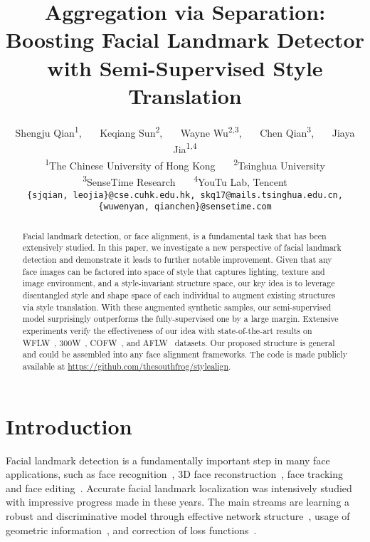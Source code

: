 \documentclass[10pt,twocolumn,letterpaper]{article}
\begin{document}
\title{Aggregation via Separation:
Boosting Facial Landmark Detector with Semi-Supervised Style Translation}

\author{Shengju Qian\textsuperscript{1},~~~  Keqiang Sun\textsuperscript{2},~~~ Wayne Wu\textsuperscript{2,3},~~~ Chen Qian\textsuperscript{3},~~~ Jiaya Jia\textsuperscript{1,4} \\
\textsuperscript{1}The Chinese University of Hong Kong~~~ \textsuperscript{2}Tsinghua University \\ \textsuperscript{3}SenseTime Research~~~ \textsuperscript{4}YouTu Lab, Tencent \\
{\tt\small \{sjqian, leojia\}@cse.cuhk.edu.hk, skq17@mails.tsinghua.edu.cn, \{wuwenyan, qianchen\}@sensetime.com}
}

\maketitle
\ificcvfinal\thispagestyle{empty}\fi
\begin{abstract}
  Facial landmark detection, or face alignment, is a fundamental task that has been extensively studied. In this paper, we investigate a new perspective of facial landmark detection and demonstrate it leads to further notable improvement. Given that any face images can be factored into space of style that captures lighting, texture and image environment, and a style-invariant structure space, our key idea is to leverage disentangled style and shape space of each individual to augment existing structures via style translation. With these augmented synthetic samples, our semi-supervised model surprisingly outperforms the fully-supervised one by a large margin. Extensive experiments verify the effectiveness of our idea with state-of-the-art results on WFLW~\cite{LAB}, 300W~\cite{sagonas2013300}, COFW~\cite{burgos2013robust}, and AFLW~\cite{AFLW} datasets. Our proposed structure is general and could be assembled into any face alignment frameworks. The code is made publicly available at \href{https://github.com/thesouthfrog/stylealign}{https://github.com/thesouthfrog/stylealign}.
\end{abstract}

\section{Introduction}

Facial landmark detection is a fundamentally important step in many face applications, such as face recognition~\cite{liu2017sphereface}, 3D face reconstruction~\cite{feng2018joint}, face tracking~\cite{khan2017synergy} and face editing~\cite{thies2016face2face}. Accurate facial landmark localization was intensively studied with impressive progress made in these years. The main streams are learning a robust and discriminative model through effective network structure~\cite{LAB}, usage of geometric information~\cite{bulat2017far,pifa}, and correction of loss functions~\cite{feng2018wing}. 
\end{document}
